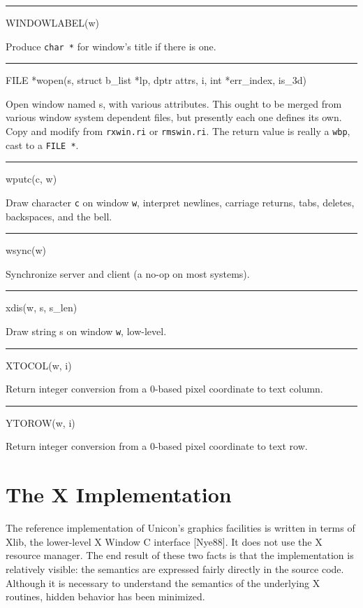 {\sffamily\bfseries
\bigskip\hrule\vspace{0.1cm}
\noindent
WINDOWLABEL(w)}


Produce \texttt{char *} for window's title if there is one.

{\sffamily\bfseries
\bigskip\hrule\vspace{0.1cm}
\noindent
FILE *wopen(s, struct b\_list *lp, dptr attrs, i, int *err\_index, is\_3d)}


Open window named s, with various attributes. This ought to be merged
from various window system dependent files, but presently each one
defines its own. Copy and modify from \texttt{rxwin.ri} or
\texttt{rmswin.ri}. The return value is really a \texttt{wbp}, cast to
a \texttt{FILE *}.


{\sffamily\bfseries
\bigskip\hrule\vspace{0.1cm}
\noindent
wputc(c, w)}


Draw character \texttt{c} on window \texttt{w}, interpret newlines,
carriage returns, tabs, deletes, backspaces, and the bell.


{\sffamily\bfseries
\bigskip\hrule\vspace{0.1cm}
\noindent
wsync(w)}

Synchronize server and client (a no-op on most systems).


{\sffamily\bfseries
\bigskip\hrule\vspace{0.1cm}
\noindent
xdis(w, s, s\_len)}


Draw string s on window \texttt{w}, low-level.


{\sffamily\bfseries
\bigskip\hrule\vspace{0.1cm}
\noindent
XTOCOL(w, i)}


Return integer conversion from a 0-based pixel coordinate to text column.


{\sffamily\bfseries
\bigskip\hrule\vspace{0.1cm}
\noindent
YTOROW(w, i)}


Return integer conversion from a 0-based pixel coordinate to text row.

\section{The X Implementation}

The reference implementation of Unicon's graphics facilities is
written in terms of Xlib, the lower-level X Window C interface
[Nye88]. It does not use the X resource manager. The end result of
these two facts is that the implementation is relatively visible: the
semantics are expressed fairly directly in the source code. Although
it is necessary to understand the semantics of the underlying X
routines, hidden behavior has been minimized.

